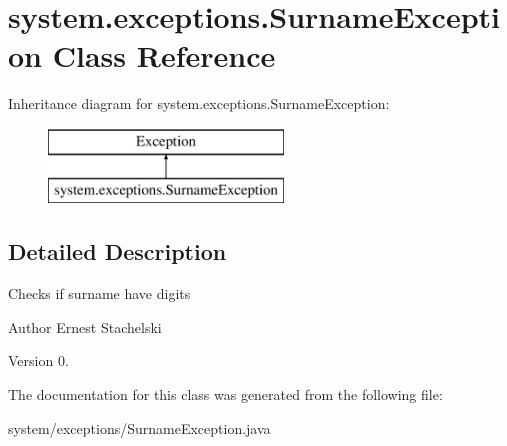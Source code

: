 \hypertarget{classsystem_1_1exceptions_1_1_surname_exception}{}\section{system.\+exceptions.\+Surname\+Exception Class Reference}
\label{classsystem_1_1exceptions_1_1_surname_exception}
Inheritance diagram for system.\+exceptions.\+Surname\+Exception\+:\begin{figure}[H]
\begin{center}
\leavevmode
\includegraphics[height=2.000000cm]{classsystem_1_1exceptions_1_1_surname_exception}
\end{center}
\end{figure}


\subsection{Detailed Description}
Checks if surname have digits \begin{DoxyAuthor}{Author}
Ernest Stachelski 
\end{DoxyAuthor}
\begin{DoxyVersion}{Version}
0. 
\end{DoxyVersion}


The documentation for this class was generated from the following file\+:\begin{DoxyCompactItemize}
\item 
system/exceptions/Surname\+Exception.\+java\end{DoxyCompactItemize}
